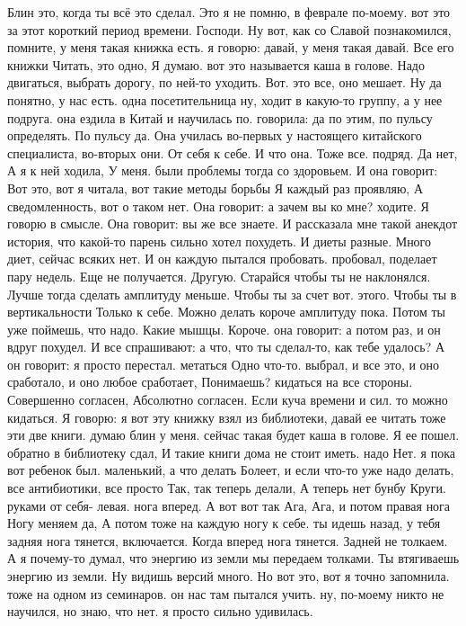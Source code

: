 Блин это, когда ты всё это сделал.
Это я не помню, в феврале по-моему.
вот это за этот короткий период времени.
Господи.
Ну вот, как со Славой познакомился, помните, у меня такая книжка есть. я говорю: давай, у меня такая давай.
Все его книжки Читать, это одно, Я думаю. вот это называется каша в голове. Надо двигаться, выбрать дорогу, по ней-то уходить. Вот.
это все, оно мешает. Ну да понятно, у нас есть.
одна посетительница ну, ходит в какую-то группу, а у нее подруга. она ездила в Китай и научилась по.
говорила: да по этим, по пульсу определять.
По пульсу да.
Она училась во-первых у настоящего китайского специалиста, во-вторых они.
От себя к себе.
И что она.
Тоже все.
подряд. Да нет, А я к ней ходила, У меня.
были проблемы тогда со здоровьем. И она говорит: Вот это, вот я читала, вот такие методы борьбы Я каждый раз проявляю, А сведомленность, вот о таком нет.
Она говорит: а зачем вы ко мне?
ходите.
Я говорю в смысле.
Она говорит: вы же все знаете.
И рассказала мне такой анекдот история, что какой-то парень сильно хотел похудеть.
И диеты разные.
Много диет, сейчас всяких нет.
И он каждую пытался пробовать. пробовал, поделает пару недель.
Еще не получается.
Другую.
Старайся чтобы ты не наклонялся.
Лучше тогда сделать амплитуду меньше.
Чтобы ты за счет вот.
этого.
Чтобы ты в вертикальности
Только к себе.
Можно делать короче амплитуду пока.
Потом ты уже поймешь, что надо.
Какие мышцы.
Короче. она говорит: а потом раз, и он вдруг похудел.
И все спрашивают: а что, что ты сделал-то, как тебе удалось?
А он говорит: я просто перестал.
метаться Одно что-то.
выбрал, и все это, и оно сработало, и оно любое сработает, Понимаешь?
кидаться на все стороны. Совершенно согласен, Абсолютно согласен.
Если куча времени и сил.
то можно кидаться. Я говорю: я вот эту книжку взял из библиотеки, давай ее читать тоже эти две книги. думаю блин у меня.
сейчас такая будет каша в голове. Я ее пошел.
обратно в библиотеку сдал, И такие книги дома не стоит иметь. надо Нет.
я пока вот ребенок был.
маленький, а что делать Болеет, и если что-то уже надо делать,
все антибиотики, все просто Так, так теперь делали, А теперь нет бунбу Круги.
руками от себя- левая.
нога вперед. А вот вот так Ага, Ага, и потом правая нога Ногу меняем да, А потом тоже на каждую ногу к себе.
ты идешь назад, у тебя задняя нога тянется, включается.
Когда вперед нога тянется.
Задней не толкаем.
А я почему-то думал, что энергию из земли мы передаем толками.
Ты втягиваешь энергию из земли.
Ну видишь версий много.
Но вот это, вот я точно запомнила.
тоже на одном из семинаров. он нас там пытался учить. ну, по-моему никто не научился, но знаю, что нет. я просто сильно удивилась.
